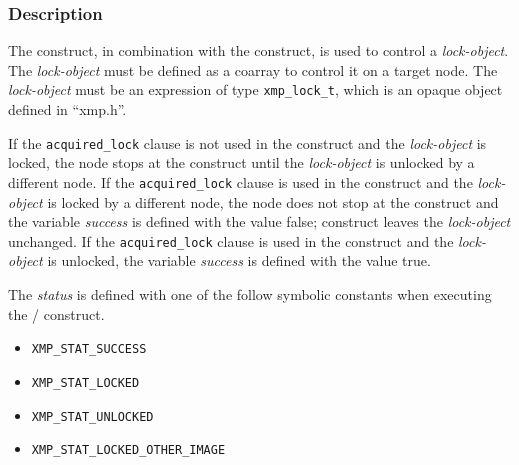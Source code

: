 \subsubsection*{Description}
The {\tt {}} construct, in combination with the {\tt {}} construct,
is used to control a {\it lock-object}.
The {\it lock-object} must be defined as a coarray to control it on a target node.
The {\it lock-object} must be an expression of type {\tt xmp\_lock\_t}, 
which is an opaque object defined in ``xmp.h''.

If the {\tt acquired\_lock} clause is not used in the {\tt {}} construct and 
the {\it lock-object} is locked,
the node stops at the {\tt {}} construct until the {\it lock-object} is unlocked by a different node.
If the {\tt acquired\_lock} clause is used in the {\tt {}} construct and 
the {\it lock-object} is locked by a different node,
the node does not stop at the {\tt {}} construct and the
variable {\it success} is defined with the value false;
{\tt {}} construct leaves the {\it lock-object}
unchanged.
If the {\tt acquired\_lock} clause is used in the {\tt {}}
construct and the {\it lock-object} is unlocked,
the variable {\it success} is defined with the value true.

The {\it status} is defined with one of the follow symbolic constants 
when executing the {\tt {}}/{\tt {}}
construct.

\begin{itemize}
\item {\tt XMP\_STAT\_SUCCESS} \vspace{-2mm}
\item {\tt XMP\_STAT\_LOCKED} \vspace{-2mm}
\item {\tt XMP\_STAT\_UNLOCKED} \vspace{-2mm}
\item {\tt XMP\_STAT\_LOCKED\_OTHER\_IMAGE}
\end{itemize}

